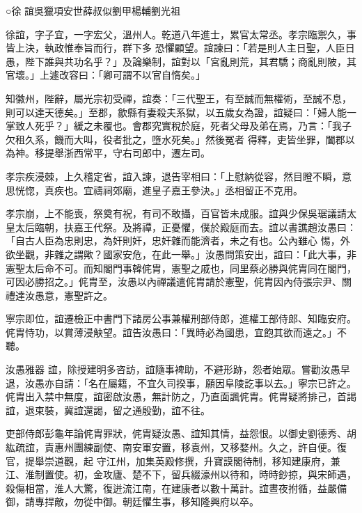 
\begin{pinyinscope}

 ○徐
 誼吳獵項安世薛叔似劉甲楊輔劉光祖



 徐誼，字子宜，一字宏父，溫州人。乾道八年進士，累官太常丞。孝宗臨禦久，事皆上決，執政惟奉旨而行，群下多
 恐懼顧望。誼諫曰：「若是則人主日聖，人臣日愚，陛下誰與共功名乎？」及論樂制，誼對以「宮亂則荒，其君驕；商亂則陂，其官壞。」上遽改容曰：「卿可謂不以官自惰矣。」



 知徽州，陛辭，屬光宗初受禪，誼奏：「三代聖王，有至誠而無權術，至誠不息，則可以達天德矣。」至郡，歙縣有妻殺夫系獄，以五歲女為證，誼疑曰：「婦人能一掌致人死乎？」緩之未覆也。會郡究實稅於庭，死者父母及弟在焉，乃言：「我子欠租久系，饑而大叫，役者批之，墮水死矣。」然後冤者
 得釋，吏皆坐罪，闔郡以為神。移提舉浙西常平，守右司郎中，遷左司。



 孝宗疾浸棘，上久稽定省，誼入諫，退告宰相曰：「上慰納從容，然目瞪不瞬，意思恍惚，真疾也。宜禱祠郊廟，進皇子嘉王參決。」丞相留正不克用。



 孝宗崩，上不能喪，祭奠有祝，有司不敢攝，百官皆未成服。誼與少保吳琚議請太皇太后臨朝，扶嘉王代祭。及將禫，正憂懼，僕於殿庭而去。誼以書譙趙汝愚曰：「自古人臣為忠則忠，為奸則奸，忠奸雜而能濟者，未之有也。公內雖心
 惕，外欲坐觀，非雜之謂歟？國家安危，在此一舉。」汝愚問策安出，誼曰：「此大事，非憲聖太后命不可。而知閣門事韓侂胄，憲聖之戚也，同里蔡必勝與侂胄同在閣門，可因必勝招之。」侂胄至，汝愚以內禪議遣侂胄請於憲聖，侂胄因內侍張宗尹、關禮達汝愚意，憲聖許之。



 寧宗即位，誼遷檢正中書門下諸房公事兼權刑部侍郎，進權工部侍郎、知臨安府。侂胄恃功，以賞薄浸觖望。誼告汝愚曰：「異時必為國患，宜飽其欲而遠之。」不聽。



 汝愚雅器
 誼，除授建明多咨訪，誼隨事裨助，不避形跡，怨者始眾。嘗勸汝愚早退，汝愚亦自請：「名在屬籍，不宜久司揆事，願因阜陵訖事以去。」寧宗已許之。侂胄出入禁中無度，誼密啟汝愚，無計防之，乃直面諷侂胄。侂胄疑將排己，首謁誼，退束裝，冀誼還謁，留之通殷勤，誼不往。



 吏部侍郎彭龜年論侂胄罪狀，侂胄疑汝愚、誼知其情，益怨恨。以御史劉德秀、胡紘疏誼，責惠州團練副使、南安軍安置，移袁州，又移婺州。久之，許自便。復官，提舉崇道觀，起
 守江州，加集英殿修撰，升寶謨閣待制，移知建康府，兼江、淮制置使。初，金攻廬、楚不下，留兵綴濠州以待和，時時鈔掠，與宋師遇，殺傷相當，淮人大驚，復迸流江南，在建康者以數十萬計。誼晝夜拊循，益嚴備御，請專捍敵，勿從中御。朝廷懼生事，移知隆興府以卒。




\end{pinyinscope}
